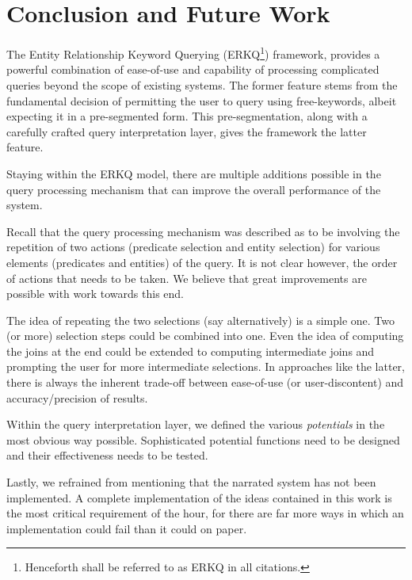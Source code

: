 \chapter{Conclusion and Future Work}

The Entity Relationship Keyword Querying (ERKQ\footnote{Henceforth shall be referred to as ERKQ in all citations.}) framework, provides a powerful combination of ease-of-use and capability of processing complicated queries beyond the scope of existing systems. The former feature stems from the fundamental decision of permitting the user to query using free-keywords, albeit expecting it in a pre-segmented form. This pre-segmentation, along with a carefully crafted query interpretation layer, gives the framework the latter feature.

Staying within the ERKQ model, there are multiple additions possible in the query processing mechanism that can improve the overall performance of the system. 

Recall that the query processing mechanism was described as to be involving the repetition of two actions (predicate selection and entity selection) for various elements (predicates and entities) of the query. It is not clear however, the order of actions that needs to be taken. We believe that great improvements are possible with work towards this end.

The idea of repeating the two selections (say alternatively) is a simple one. Two (or more) selection steps could be combined into one. Even the idea of computing the joins at the end could be extended to computing intermediate joins and prompting the user for more intermediate selections. In approaches like the latter, there is always the inherent trade-off between ease-of-use (or user-discontent) and accuracy/precision of results.

Within the query interpretation layer, we defined the various \emph{potentials} in the most obvious way possible. Sophisticated potential functions need to be designed and their effectiveness needs to be tested.

Lastly, we refrained from mentioning that the narrated system has not been implemented. A complete implementation of the ideas contained in this work is the most critical requirement of the hour, for there are far more ways in which an implementation could fail than it could on paper.